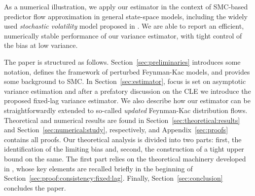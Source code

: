 As a numerical illustration, we apply our estimator in the context of SMC-based predictor flow approximation in general state-space models, including the widely used \emph{stochastic volatility} model proposed in \cite{hull:white:1987}. We are able to report an efficient, numerically stable performance of our variance estimator, with tight control of the bias at low variance. 

The paper is structured as follows. Section~\ref{sec:preliminaries} introduces some notation, defines the framework of perturbed Feynman-Kac models, and provides some background to SMC. In Section~\ref{sec:estimator}, focus is set on asymptotic variance estimation and after a prefatory discussion on the CLE we introduce the proposed fixed-lag variance estimator. We also describe how our estimator can be straightforwardly extended to so-called \emph{updated} Feynman-Kac distribution flows. Theoretical and numerical results are found in Section~\ref{sec:theoretical:results} and Section~\ref{sec:numerical:study}, respectively, and Appendix~\ref{sec:proofs} contains all proofs. Our theoretical analysis is divided into two parts: first, the identification of the limiting bias and, second, the construction of a tight upper bound on the same. The first part relies on the theoretical machinery developed in \cite{lee:whiteley:2016}, whose key elements are recalled briefly in the beginning of Section~\ref{sec:proof:consistency:fixed:lag}. Finally, Section~\ref{sec:conclusion} concludes the paper. 















 